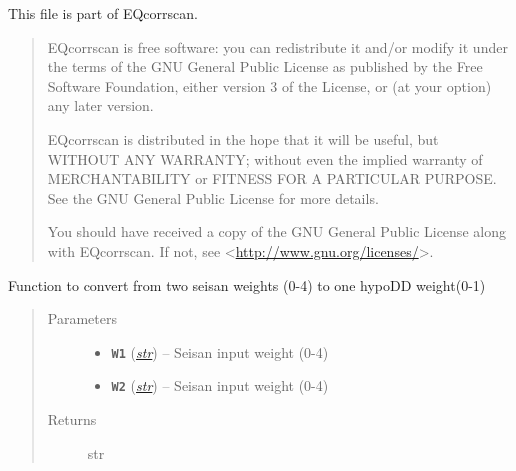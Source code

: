 \documentclass[a4paper,10pt,english]{sphinxmanual}
\begin{document}
This file is part of EQcorrscan.
\begin{quote}

EQcorrscan is free software: you can redistribute it and/or modify
it under the terms of the GNU General Public License as published by
the Free Software Foundation, either version 3 of the License, or
(at your option) any later version.

EQcorrscan is distributed in the hope that it will be useful,
but WITHOUT ANY WARRANTY; without even the implied warranty of
MERCHANTABILITY or FITNESS FOR A PARTICULAR PURPOSE.  See the
GNU General Public License for more details.

You should have received a copy of the GNU General Public License
along with EQcorrscan.  If not, see \textless{}\href{http://www.gnu.org/licenses/}{http://www.gnu.org/licenses/}\textgreater{}.
\end{quote}

\begin{fulllineitems}
\label{utils:catalogue2DD._av_weight}
Function to convert from two seisan weights (0-4) to one hypoDD weight(0-1)
\begin{quote}\begin{description}
\item[{Parameters}] \leavevmode\begin{itemize}
\item {} 
\textbf{\texttt{W1}} (\href{https://docs.python.org/library/functions.html\#str}{\emph{str}}) -- Seisan input weight (0-4)

\item {} 
\textbf{\texttt{W2}} (\href{https://docs.python.org/library/functions.html\#str}{\emph{str}}) -- Seisan input weight (0-4)

\end{itemize}

\item[{Returns}] \leavevmode
str

\end{description}\end{quote}

\end{fulllineitems}

\end{document}
